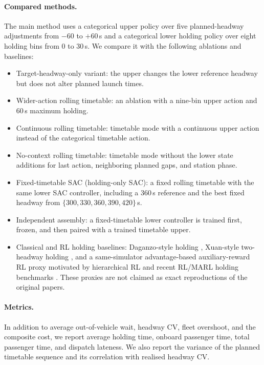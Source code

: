 \paragraph{Compared methods.}
The main method uses a categorical upper policy over five planned-headway adjustments from $-60$ to $+60$\,s and a categorical lower holding policy over eight holding bins from 0 to 30\,s. We compare it with the following ablations and baselines:
\begin{itemize}[leftmargin=*]
    \item Target-headway-only variant: the upper changes the lower reference headway but does not alter planned launch times.
    \item Wider-action rolling timetable: an ablation with a nine-bin upper action and 60\,s maximum holding.
    \item Continuous rolling timetable: timetable mode with a continuous upper action instead of the categorical timetable action.
    \item No-context rolling timetable: timetable mode without the lower state additions for last action, neighboring planned gaps, and station phase.
    \item Fixed-timetable SAC (holding-only SAC): a fixed rolling timetable with the same lower SAC controller, including a 360\,s reference and the best fixed headway from $\{300,330,360,390,420\}$\,s.
    \item Independent assembly: a fixed-timetable lower controller is trained first, frozen, and then paired with a trained timetable upper.
    \item Classical and RL holding baselines: Daganzo-style holding \citep{daganzo2009headway}, Xuan-style two-headway holding \citep{xuan2011dynamic}, and a same-simulator advantage-based auxiliary-reward RL proxy motivated by hierarchical RL and recent RL/MARL holding benchmarks \citep{li2019hierarchical,singh2024piper,wang2021asynchronous,wang2023robust,yu2024hierarchical,xu2025systematic,li2026graphaware}. These proxies are not claimed as exact reproductions of the original papers.
\end{itemize}

\paragraph{Metrics.}
In addition to average out-of-vehicle wait, headway CV, fleet overshoot, and the composite cost, we report average holding time, onboard passenger time, total passenger time, and dispatch lateness. We also report the variance of the planned timetable sequence and its correlation with realised headway CV.

